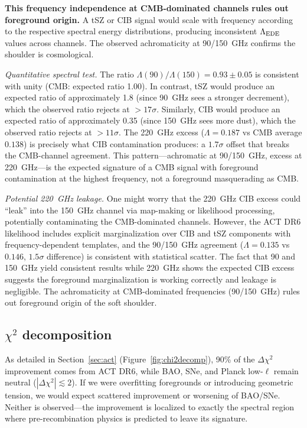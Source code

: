 \documentclass[onecolumn,showpacs,preprintnumbers,amsmath,amssymb,prd]{revtex4-2}
\begin{document}
\textbf{This frequency independence at CMB-dominated channels rules out 
foreground origin.} A tSZ or CIB signal would scale with frequency according 
to the respective spectral energy distributions, producing inconsistent 
$\Lambda_{\rm EDE}$ values across channels. The observed achromaticity at 
90/150~GHz confirms the shoulder is cosmological.

\emph{Quantitative spectral test.} The ratio $\Lambda(90)/\Lambda(150) = 
0.93 \pm 0.05$ is consistent with unity (CMB: expected ratio 1.00). 
In contrast, tSZ would produce an expected ratio of approximately 1.8 (since 90~GHz sees a stronger decrement), which the observed ratio rejects at $>17\sigma$. Similarly, CIB would produce an expected ratio of approximately 0.35 (since 150~GHz sees more dust), which the observed ratio rejects at $>11\sigma$.
The 220~GHz excess ($\Lambda = 0.187$ vs CMB average $0.138$) is precisely 
what CIB contamination produces: a $1.7\sigma$ offset that breaks the 
CMB-channel agreement. This pattern---achromatic at 90/150~GHz, excess 
at 220~GHz---is the expected signature of a CMB signal with foreground 
contamination at the highest frequency, not a foreground masquerading as CMB.

\emph{Potential 220~GHz leakage.} One might worry that the 220~GHz CIB 
excess could ``leak'' into the 150~GHz channel via map-making or likelihood 
processing, potentially contaminating the CMB-dominated channels. However, 
the ACT DR6 likelihood includes explicit marginalization over CIB and tSZ 
components with frequency-dependent templates, and the 90/150~GHz agreement 
($\Lambda = 0.135$ vs $0.146$, $1.5\sigma$ difference) is consistent with 
statistical scatter. The fact that 90 and 150~GHz yield consistent results 
while 220~GHz shows the expected CIB excess suggests the foreground 
marginalization is working correctly and leakage is negligible. The 
achromaticity at CMB-dominated frequencies (90/150~GHz) rules out foreground 
origin of the soft shoulder.

\subsection{$\chi^2$ decomposition}

As detailed in Section~\ref{sec:act} (Figure~\ref{fig:chi2decomp}), 
90\% of the $\Delta\chi^2$ improvement comes from ACT DR6, while 
BAO, SNe, and Planck low-$\ell$ remain neutral ($|\Delta\chi^2| \lesssim 2$).
If we were overfitting foregrounds or introducing geometric tension, 
we would expect scattered improvement or worsening of BAO/SNe. Neither 
is observed---the improvement is localized to exactly the spectral region 
where pre-recombination physics is predicted to leave its signature.
\end{document}
